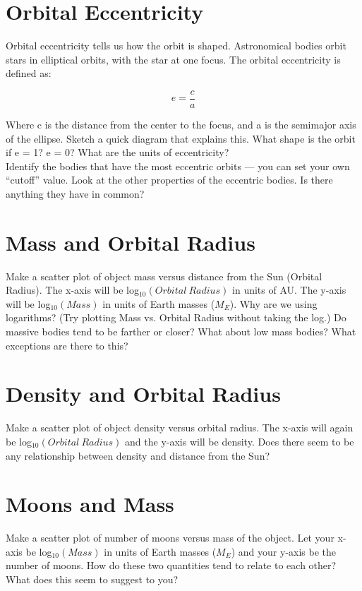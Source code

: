 \documentclass[12pt]{article}
\begin{document}
\section*{Orbital Eccentricity}
Orbital eccentricity tells us how the orbit is shaped. Astronomical bodies orbit stars in elliptical orbits, with the star at one focus. The orbital eccentricity is defined as:

\[e = \frac{c}{a}\]

\noindent Where c is the distance from the center to the focus, and a is the semimajor axis of the ellipse. Sketch a quick diagram that explains this. What shape is the orbit if e = 1? e = 0? What are the units of eccentricity?\\

\noindent Identify the bodies that have the most eccentric orbits --- you can set your own ``cutoff'' value. Look at the other properties of the eccentric bodies. Is there anything they have in common?

\section*{Mass and Orbital Radius}
 Make a scatter plot of object mass versus distance from the Sun (Orbital Radius). The x-axis will be log$_{10}(Orbital~Radius)$ in units of AU. The y-axis will be log$_{10}(Mass)$ in units of Earth masses ($M_E$). Why are we using logarithms? (Try plotting Mass vs. Orbital Radius without taking the log.) Do massive bodies tend to be farther or closer? What about low mass bodies? What exceptions are there to this?

\section*{Density and Orbital Radius}
Make a scatter plot of object density versus orbital radius. The x-axis will again be log$_{10}(Orbital~Radius)$ and the y-axis will be density. Does there seem to be any relationship between density and distance from the Sun? 

\section*{Moons and Mass}
Make a scatter plot of number of moons versus mass of the object. Let your x-axis be log$_{10}(Mass)$ in units of Earth masses ($M_E$) and your y-axis be the number of moons. How do these two quantities tend to relate to each other? What does this seem to suggest to you?
\end{document}
